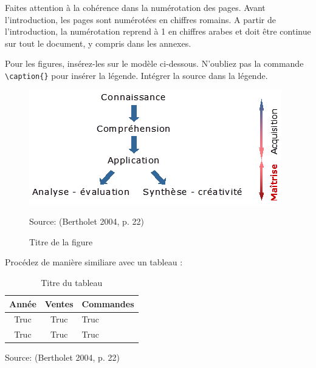 Faites attention à la cohérence dans la numérotation des pages. Avant l'introduction, les pages sont numérotées en chiffres romains. A partir de l'introduction, la numérotation reprend à 1 en chiffres arabes et doit être continue sur tout le document, y compris dans les annexes.

Pour les figures, insérez-les sur le modèle ci-dessous. N'oubliez pas la commande \verb?\caption{}? pour insérer la légende. Intégrer la source dans la légende.

\begin{figure}[H]
	\noindent \begin{centering}
	\caption{Titre de la figure}
	\bigskip{}
		\includegraphics{images/image3.png}\bigskip{}
	\par\end{centering}
	\noindent \begin{raggedleft}
		Source: (Bertholet 2004, p. 22) %
	\par\end{raggedleft}
\end{figure}

Procédez de manière similiare avec un tableau :

\begin{table}
	\noindent \begin{centering}
	\caption{Titre du tableau}
	\bigskip{}
		\begin{tabular}[h]{|c|c|m{0.2\textwidth}|}
			\hline
			Année & Ventes & Commandes \\
			\hline
			Truc & Truc & Truc \\
			\hline
			Truc & Truc & Truc \\
			\hline
		\end{tabular}
	\par\end{centering}
	\noindent \begin{raggedleft}
		Source: (Bertholet 2004, p. 22) %
	\par\end{raggedleft}
\end{table}

